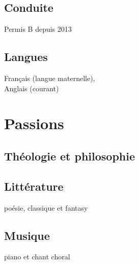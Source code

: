 \documentclass[]{cv-template}
\begin{document}
\begin{minipage}[t]{0.34\textwidth}
\subsection{Conduite}
Permis B depuis 2013
  
\sectionsep
\subsection{Langues}
\mycaret  Français (langue maternelle), \\
\mycaret  Anglais (courant) \\
\sectionsep



\section{Passions}
\subsection{Théologie et philosophie}
\sectionsep
\subsection{Littérature}
poésie, classique et fantasy\\
\subsection{Musique}
piano et chant choral\\



\end{minipage}
\end{document}
